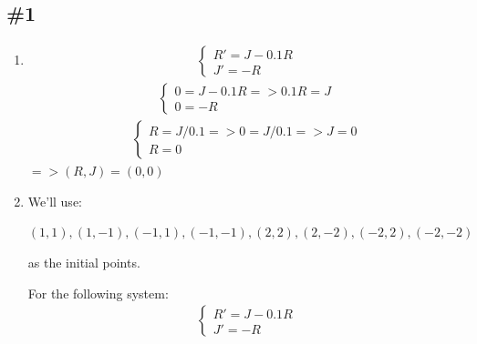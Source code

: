 \documentclass[12pt]{article}
\begin{document}
\subsection*{\#1}
\begin{enumerate}[label=\alph*.]
    \item \begin{align*}
        \begin{cases}
        R' = J - 0.1R \\
        J' = -R
        \end{cases}
    \end{align*}
    \begin{align*}
        \begin{cases}
        0 = J - 0.1R => 0.1R = J \\
        0 = -R
        \end{cases}
    \end{align*}
    \begin{align*}
        \begin{cases}
        R = J / 0.1 => 0 = J / 0.1 => J = 0 \\
        R = 0
        \end{cases}
    \end{align*}
    $=> (R,J) = (0,0)$
    \item We'll use:
    \begin{center}
    $(1,1), (1,-1), (-1,1), (-1,-1), (2,2), (2,-2), (-2, 2), (-2,-2)$ 
    \end{center}
    as the initial points.
    
    For the following system: 
    \begin{align*}
        \begin{cases}
        R' = J - 0.1R \\
        J' = -R
        \end{cases}
    \end{align*}


\end{enumerate}
\end{document}
